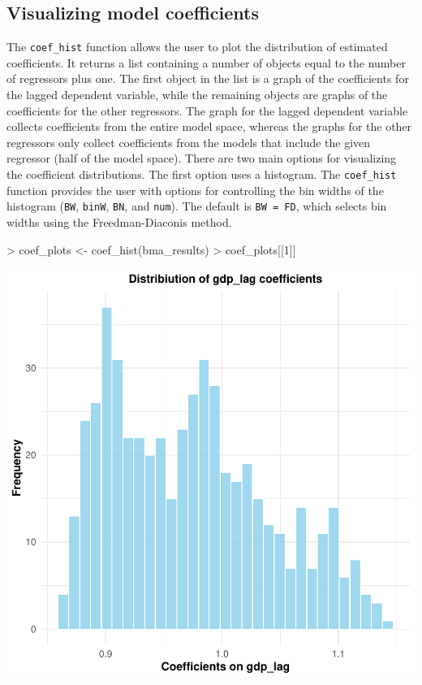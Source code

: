 \documentclass[a4paper]{article}
\begin{document}
\subsection{Visualizing model coefficients}
The \verb+coef_hist+ function allows the user to plot the distribution of estimated coefficients.
It returns a list containing a number of objects equal to the number of regressors plus one.
The first object in the list is a graph of the coefficients for the lagged dependent variable, while the remaining objects are graphs of the coefficients for the other regressors.
The graph for the lagged dependent variable collects coefficients from the entire model space, whereas the graphs for the other regressors only collect coefficients from the models that include the given regressor (half of the model space).
There are two main options for visualizing the coefficient distributions.
The first option uses a histogram.
The \verb+coef_hist+ function provides the user with options for controlling the bin widths of the histogram (\verb+BW+, \verb+binW+, \verb+BN+, and \verb+num+).
The default is \verb+BW = FD+, which selects bin widths using the Freedman-Diaconis method.
\begin{Schunk}
\begin{Sinput}
> coef_plots <- coef_hist(bma_results)
> coef_plots[[1]]
\end{Sinput}
\end{Schunk}
\includegraphics{bdsm_vignette-023}
\end{document}
